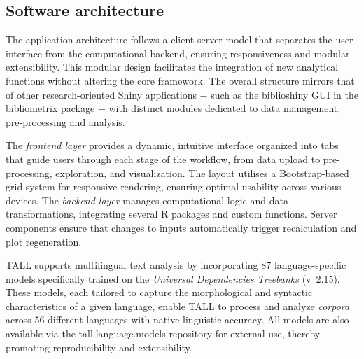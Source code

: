 \documentclass[preprint,12pt,a4paper]{elsarticle}
\begin{document}
\subsection{Software architecture}
The application architecture follows a client-server model that separates the user interface from the computational backend, ensuring responsiveness and modular extensibility. This modular design facilitates the integration of new analytical functions without altering the core framework. The overall structure mirrors that of other research-oriented Shiny applications $-$ such as the \textsf{biblioshiny} GUI in the \textsf{bibliometrix} package \cite{ari17} $-$ with distinct modules dedicated to data management, pre-processing and analysis.

The \textit{frontend layer} provides a dynamic, intuitive interface organized into tabs that guide users through each stage of the workflow, from data upload to pre-processing, exploration, and visualization. The layout utilises a Bootstrap-based grid system for responsive rendering, ensuring optimal usability across various devices. The \textit{backend layer} manages computational logic and data transformations, integrating several \textsf{R} packages and custom functions. Server components ensure that changes to inputs automatically trigger recalculation and plot regeneration. 

TALL supports multilingual text analysis by incorporating 87 language-specific models specifically trained on the \textit{Universal Dependencies Treebanks} \cite{dem21}(v~2.15). These models, each tailored to capture the morphological and syntactic characteristics of a given language, enable TALL to process and analyze \textit{corpora} across 56 different languages with native linguistic accuracy. All models are also available via the \textsf{tall.language.models} repository \cite{ari25} for external use, thereby promoting reproducibility and extensibility.
\end{document}
